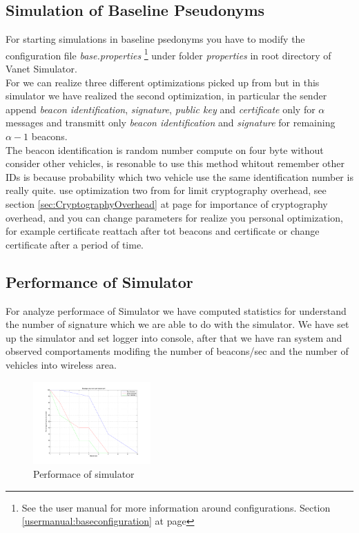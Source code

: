 \subsection{Simulation of Baseline Pseudonyms}
For starting simulations in baseline psedonyms you have to modify the configuration file \textit{base.properties} \footnote{See the user manual for more information around configurations. Section \ref{usermanual:baseconfiguration} at page \pageref{usermanual:baseconfiguration}} under folder \textit{properties} in root directory of Vanet Simulator.\\
For \baseline we can realize three different optimizations picked up from \cite{calandriello} but in this simulator we have realized the second optimization, in particular the sender append \textit{beacon identification}, \textit{signature}, \textit{public key} and \textit{certificate} only for $\alpha$ messages and transmitt only \textit{beacon identification} and \textit{signature} for remaining $\alpha-1$ beacons. \\
The beacon identification is random number compute on four byte without consider other vehicles, is resonable to use this method whitout remember other IDs is because probability which two vehicle use the same identification number is really quite.
\baseline use optimization two from \cite{calandriello} for limit cryptography overhead, see section \ref{sec:CryptographyOverhead} at page \pageref{sec:CryptographyOverhead} for importance of cryptography overhead, and you can change parameters for realize you personal optimization, for example certificate reattach after tot beacons and certificate or change certificate after a period of time.
\subsection{Performance of Simulator}
For analyze performace of Simulator we have computed statistics for understand the number of signature which we are able to do with the simulator. We have set up the \baseline simulator and set logger into console, after that we have ran system and observed comportaments modifing the number of beacons/sec and the number of vehicles into wireless area.
\begin{figure}[ht]
\centerline{\includegraphics[width=0.4\textwidth]{chart_baseline.pdf}}
\caption{Performace of simulator}
\label{fig:performance}
\end{figure}